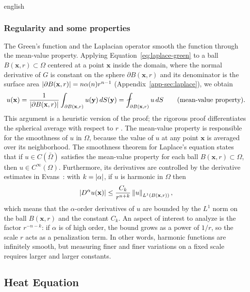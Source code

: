 \documentclass[0000.tex]{subfiles}
\begin{document}
\begin{hyphenrules}{english}
\subsubsection{Regularity and some properties}
The Green's function and the Laplacian operator smooth the function through the mean-value property.
Applying Equation~\eqref{eq:laplace-green} to a ball $B(\mathbf{x},r)\subset\Omega$ centered at a point $\mathbf{x}$
inside the domain, where the normal derivative of $G$ is constant on the sphere $\partial B(\mathbf{x},r)$ and
its denominator is the surface area $\left\lvert \partial B(\mathbf{x},r) \right\rvert=n\alpha(n)r^{n-1}$
(Appendix~\ref{app-sec:laplace}), we obtain
\begin{equation}
  u(\mathbf{x})=\frac{1}{\abs{\partial B(\mathbf{x},r)}}\int_{\partial B(\mathbf{x},r)}u(\mathbf{y})\,d S(\mathbf{y})
  =\fint_{\partial B(\mathbf{x},r)}u\,d S \qquad\text{(mean-value property)}.
  \label{eq:mvp}
\end{equation}
This argument is a heuristic version of the proof; the rigorous proof differentiates the spherical
average with respect to $r$ \cite[Section 2.2.2]{evans2010}. The mean-value property is
responsible for the smoothness of $u$ in $\Omega$, because the value of $u$ at any point $\mathbf{x}$ is
averaged over its neighborhood. The smoothness theorem for Laplace's equation states that if
$u\in C(\bar\Omega)$ satisfies the mean-value property for each ball $B(\mathbf{x},r)\subset\Omega$, then
$u\in C^\infty(\Omega)$. Furthermore, its derivatives are controlled by the derivative estimates in
Evans~\cite{evans2010}: with $k=\left\lvert \alpha \right\rvert$, if $u$ is harmonic in $\Omega$ then
\begin{equation}
  \left\lvert D^\alpha u(\mathbf{x}) \right\rvert\le\frac{C_k}{r^{n+k}}\left\lVert u \right\rVert_{L^1(B(\mathbf{x},r))},
  \label{eq:harmonic-estimate}
\end{equation}
which means that the $\alpha$-order derivatives of $u$ are bounded by the $L^1$ norm on the ball
$B(\mathbf{x},r)$ and the constant $C_k$. An aspect of interest to analyze is the factor $r^{-n-k}$: if $\alpha$
is of high order, the bound grows as a power of $1/r$, so the scale $r$ acts as a penalization term.
In other words, harmonic functions are infinitely smooth, but measuring finer and finer variations on a
fixed scale requires larger and larger constants.

\subsection{Heat Equation}\label{subsec:heat}


\end{hyphenrules}
\end{document}
